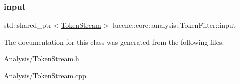 \subsubsection{\texorpdfstring{input}{input}}
{\footnotesize\ttfamily std\+::shared\+\_\+ptr$<$\mbox{\hyperlink{classlucene_1_1core_1_1analysis_1_1TokenStream}{Token\+Stream}}$>$ lucene\+::core\+::analysis\+::\+Token\+Filter\+::input\hspace{0.3cm}{\ttfamily [protected]}}



The documentation for this class was generated from the following files\+:\begin{DoxyCompactItemize}
\item 
Analysis/\mbox{\hyperlink{TokenStream_8h}{Token\+Stream.\+h}}\item 
Analysis/\mbox{\hyperlink{TokenStream_8cpp}{Token\+Stream.\+cpp}}\end{DoxyCompactItemize}
